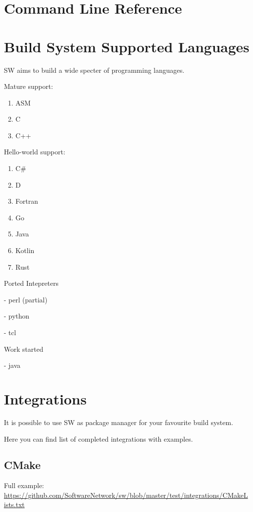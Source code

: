 \section{Command Line Reference}




\section{Build System Supported Languages}

SW aims to build a wide specter of programming languages.

Mature support:
\begin{enumerate}
\item ASM
\item C
\item C++
\end{enumerate}

Hello-world support:
\begin{enumerate}
\item C\#
\item D
\item Fortran
\item Go
\item Java
\item Kotlin
\item Rust
\end{enumerate}


Ported Intepreters

- perl (partial)

- python

- tcl

Work started

- java


\section{Integrations}

It is possible to use SW as package manager for your favourite build system.

Here you can find list of completed integrations with examples.

\subsection{CMake}


Full example:\\
\url{https://github.com/SoftwareNetwork/sw/blob/master/test/integrations/CMakeLists.txt}

